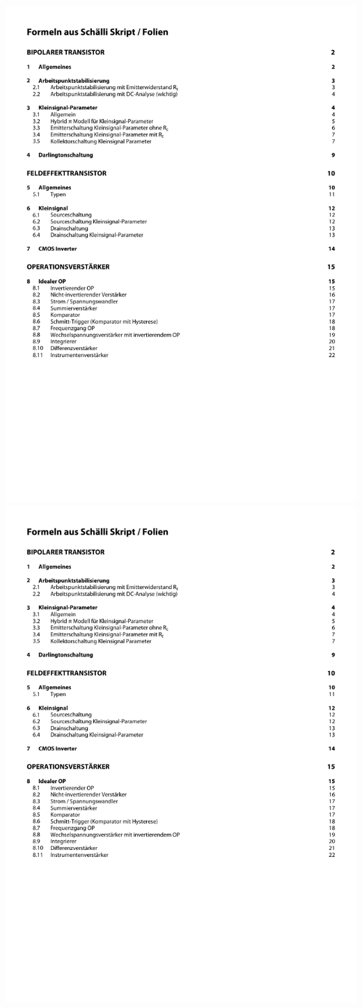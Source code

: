 \includegraphics[page=22,scale=0.57,trim=20mm 20mm 20mm 20mm]{Formeln_Elektronik_Schaelli}\newpage
\includegraphics[page=23,scale=0.57,trim=20mm 20mm 20mm 20mm]{Formeln_Elektronik_Schaelli}\newpage
